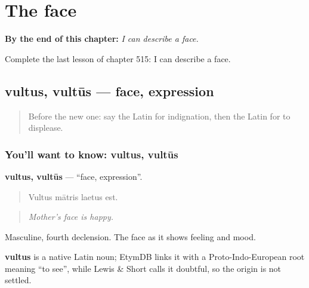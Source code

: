 
\chapter{The face}
\label{ch:la-the-face}

\begin{chapteropening}
\textbf{By the end of this chapter:} \emph{I can describe a face.}

Complete the last lesson of chapter 515: I can describe a face.
\end{chapteropening}

\section[vultus, vultūs]{vultus, vultūs — face, expression}

\label{lesson:LA-C515-vultus}



\begin{quote}
Before the new one: say the Latin for indignation, then the Latin for to displease.
\end{quote}

\subsection*{You'll want to know: vultus, vultūs}
\textbf{vultus, vultūs} — \textquotedblleft{}face, expression\textquotedblright{}.

\begin{quote}
Vultus mātris laetus est.
\end{quote}

\begin{quote}
\emph{Mother's face is happy.}
\end{quote}

Masculine, fourth declension. The face as it shows feeling and mood.

\begin{cousinweb}
\textbf{vultus} is a native Latin noun; EtymDB links it with a Proto-Indo-European root meaning \textquotedblleft{}to see\textquotedblright{}, while Lewis \& Short calls it doubtful, so the origin is not settled.
\end{cousinweb}

